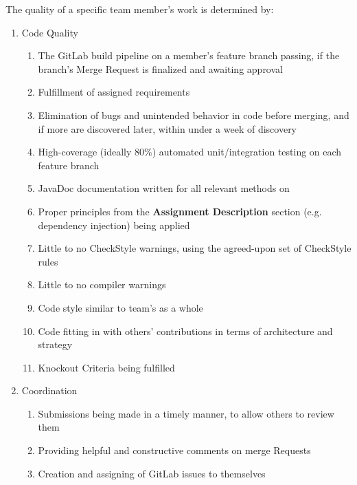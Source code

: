 The quality of a specific team member’s work is determined by:
\begin{enumerate}
    \item Code Quality
    \begin{enumerate}
        \item The GitLab build pipeline on a member’s feature branch passing, if the branch’s Merge Request is finalized and awaiting approval
        \item Fulfillment of assigned requirements
        \item Elimination of bugs and unintended behavior in code before merging, and if more are discovered later, within under a week of discovery
        \item High-coverage (ideally 80\%) automated unit/integration testing on each feature branch
        \item JavaDoc documentation written for all relevant methods on
        \item Proper principles from the \textbf{Assignment Description} section (e.g. dependency injection) being applied
        \item Little to no CheckStyle warnings, using the agreed-upon set of CheckStyle rules
        \item Little to no compiler warnings
        \item Code style similar to team’s as a whole
        \item Code fitting in with others’ contributions in terms of architecture and strategy
        \item Knockout Criteria being fulfilled
    \end{enumerate}
    \item Coordination
    \begin{enumerate}
        \item Submissions being made in a timely manner, to allow others to review them
        \item Providing helpful and constructive comments on merge Requests
        \item Creation and assigning of GitLab issues to themselves
    \end{enumerate}
\end{enumerate}
